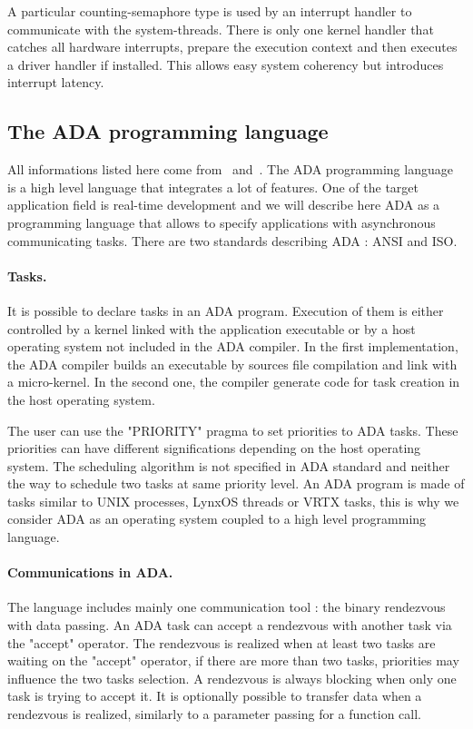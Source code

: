\documentclass[10pt]{report}
\begin{document}
A particular counting-semaphore type is used by an interrupt handler to communicate with the system-threads. There is only one
kernel handler that catches all hardware interrupts, prepare the execution context and then executes a driver handler if installed.
This allows easy system coherency but introduces interrupt latency.

\subsection{The ADA programming language}

All informations listed here come from~\cite{Booch:86} and~\cite{ADA:83}. The ADA programming language is a high level language
that integrates a lot of features. One of the target application field is real-time development and we will describe here ADA
as a programming language that allows to specify applications with asynchronous communicating tasks. There are two standards
describing ADA : ANSI and ISO.

\paragraph{Tasks.} It is possible to declare tasks in an ADA program. Execution of them is either controlled by a kernel linked
with the application executable or by a host operating system not included in the ADA compiler. In the first implementation,
the ADA compiler builds an executable by sources file compilation and link with a micro-kernel. In the second one, the compiler
generate code for task creation in the host operating system.

The user can use the "PRIORITY" pragma to set priorities to ADA tasks. These priorities can have different significations
depending on the host operating system. The scheduling algorithm is not specified in ADA standard and neither the way to schedule
two tasks at same priority level. An ADA program is made of tasks similar to UNIX processes, LynxOS threads or VRTX tasks, this
is why we consider ADA as an operating system coupled to a high level programming language.

\paragraph{Communications in ADA.} The language includes mainly one communication tool : the binary rendezvous with data passing.
An ADA task can accept a rendezvous with another task via the "accept" operator. The rendezvous is realized when at least two
tasks are waiting on the "accept" operator, if there are more than two tasks, priorities may influence the two tasks selection.
A rendezvous is always blocking when only one task is trying to accept it. It is optionally possible to transfer data when a
rendezvous is realized, similarly to a parameter passing for a function call.
\end{document}
